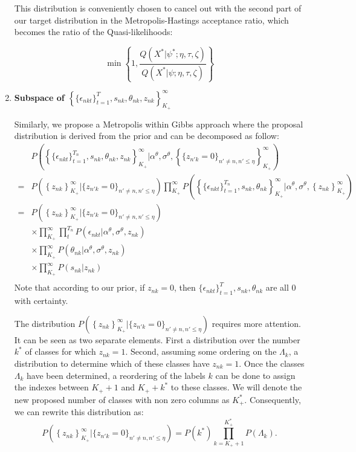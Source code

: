 \documentclass[12pt]{article}
\begin{document}
\begin{enumerate}
	This distribution is conveniently chosen to cancel out with the second part of our target distribution in the Metropolis-Hastings acceptance ratio, which becomes the ratio of the Quasi-likelihoods:
	
		$$\min\left\{ 1 ,   \frac{
		Q(X^*|\psi^*;\eta,\tau,\zeta) 
	}{
		Q(X^*|\psi;\eta,\tau,\zeta) 
	}  \right\}$$
	
	\item \textbf{Subspace of $\left\{ \{\epsilon_{nkt}\}_{t=1}^T, s_{nk}, \theta_{nk},z_{nk} \right\}_{K_+}^{\infty}$}
	
	Similarly, we propose a Metropolis within Gibbs approach where the proposal distribution is derived from the prior and can be decomposed as follow:
	\begin{align*}
		& P\left(\left\{ \{\epsilon_{nkt}\}_{t=1}^{T_n}, s_{nk}, \theta_{nk},z_{nk} \right\}_{K_+}^{\infty}|\alpha^\theta,\sigma^\theta,\left\{\{z_{n'k}=0\}_{n' \neq n, n'\leq\eta}\right\}_{K_+}^{\infty}\right) \\
		=	& P\left(\left\{z_{nk} \right\}_{K_+}^{\infty}|\{z_{n'k}=0\}_{n' \neq n, n'\leq\eta}\right) \prod_{K_+}^{\infty} P\left(\left\{ \{\epsilon_{nkt}\}_{t=1}^{T_n}, s_{nk}, \theta_{nk} \right\}_{K_+}^{\infty}|\alpha^\theta,\sigma^\theta,\left\{z_{nk} \right\}_{K_+}^{\infty} \right) \\
		=	& P\left(\left\{z_{nk} \right\}_{K_+}^{\infty}|\{z_{n'k}=0\}_{n' \neq n, n'\leq\eta}\right) \\
		& \times \prod_{K_+}^{\infty} \prod_{t}^{T_n} P(\epsilon_{nkt}|\alpha^\theta,\sigma^\theta,z_{nk}) \\
		& \times \prod_{K_+}^{\infty} P\left( \theta_{nk}  | \alpha^\theta,\sigma^\theta, z_{nk}\right) \\
		& \times \prod_{K_+}^{\infty} P\left( s_{nk} |z_{nk} \right) \\
	\end{align*}
	Note that according to our prior, if $z_{nk}=0$, then $\{\epsilon_{nkt}\}_{t=1}^T, s_{nk}, \theta_{nk}$ are all $0$ with certainty. 
	
	The distribution $P\left(\left\{z_{nk} \right\}_{K_+}^{\infty}|\{z_{n'k}=0\}_{n' \neq n, n'\leq\eta}\right)$ requires more attention. It can be seen as two separate elements. First a distribution over the number $k^*$ of classes for which $z_{nk}=1$. Second, assuming some ordering on the $\Lambda_{k}$, a distribution to determine which of these classes have $z_{nk}=1$. Once the classes $\Lambda_{k}$ have been determined, a reordering of the labels $k$ can be done to assign the indexes between $K_++1$ and $K_++k^*$ to these classes. We will denote the new proposed number of classes with non zero columns as $K_+^*$. Consequently, we can rewrite this distribution as:
	$$ P\left(\left\{z_{nk} \right\}_{K_+}^{\infty}|\{z_{n'k}=0\}_{n' \neq n, n'\leq\eta}\right) = P(k^*) \prod_{k=K_++1}^{K_+^*}P(\Lambda_{k}).$$
	

\end{enumerate}
\end{document}
